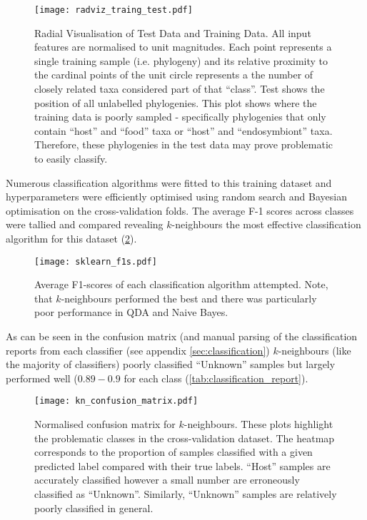 \begin{figure}[h!]
		\centering
		\texttt{[image: radviz\_traing\_test.pdf]}
        \caption[Radial visualisation of test and training Data]{Radial Visualisation of Test Data and Training Data. All input features are normalised to 
			unit magnitudes.  Each point represents a single training sample (i.e. phylogeny) and its relative proximity
			to the cardinal points of the unit circle represents a the number of closely related taxa considered part of
			that ``class''. 
			Test shows the position of all unlabelled phylogenies.  This plot shows where the training 
			data is poorly sampled - specifically phylogenies that only contain ``host'' and ``food'' taxa or
			``host'' and ``endosymbiont'' taxa.  Therefore, these phylogenies in the test 
            data may prove problematic to easily classify.}
		\label{fig:radvis_test}
\end{figure}


Numerous classification algorithms were fitted to this training dataset and
hyperparameters were efficiently optimised using random search and Bayesian optimisation on
the cross-validation folds. The average F-1 scores across classes were tallied and compared 
revealing \(k\)-neighbours the most effective classification algorithm for this dataset (\cref{fig:f1_scores}).

\begin{figure}[h!]
	\centering
	\texttt{[image: sklearn\_f1s.pdf]}
    \caption[F1-scores of different classifiers]{Average F1-scores of each classification algorithm attempted.  Note, that \(k\)-neighbours performed
    the best and there was particularly poor performance in QDA and Naive Bayes.}
	\label{fig:f1_scores} 
\end{figure}


As can be seen in the confusion matrix (and manual parsing of the classification reports
from each classifier (see appendix \cref{sec:classification})
\(k\)-neighbours (like the majority of classifiers)
poorly classified ``Unknown'' samples but largely performed well (\(0.89-0.9\) for each class
(\cref{tab:classification_report}). 

\begin{figure}[h!]
	\centering
	\texttt{[image: kn\_confusion\_matrix.pdf]}
    \caption[Normalised confusion matrix of transcript classification]{Normalised confusion matrix for \(k\)-neighbours.  These plots highlight
		the problematic classes in the cross-validation dataset. 
		 The heatmap corresponds to the proportion of samples classified
		 with a given predicted label compared with their true labels.
		``Host'' samples are accurately classified however a small number are erroneously
		classified as ``Unknown''.  Similarly, ``Unknown'' samples are relatively poorly
		classified in general.}
	\label{fig:confusion matrices} 
\end{figure}


